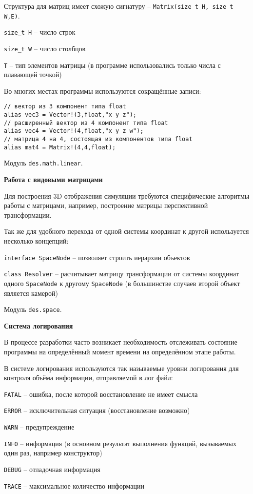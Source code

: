 Структура для матриц имеет схожую сигнатуру -- \verb|Matrix(size_t H, size_t W,E)|.

\begin{mintemize}
\item \verb|size_t H| -- число строк
\item \verb|size_t W| -- число столбцов
\item \verb|T| -- тип элементов матрицы (в программе использовались только числа с плавающей точкой)
\end{mintemize}

Во многих местах программы используются сокращённые записи:
\begin{verbatim}
// вектор из 3 компонент типа float
alias vec3 = Vector!(3,float,"x y z");
// расширенный вектор из 4 компонент типа float
alias vec4 = Vector!(4,float,"x y z w");
// матрица 4 на 4, состоящая из компонентов типа float
alias mat4 = Matrix!(4,4,float);
\end{verbatim}

Модуль \verb|des.math.linear|.

\textbf{Работа с видовыми матрицами}

Для построения 3D отображения симуляции требуются специфические алгоритмы работы
с матрицами, например, построение матрицы перспективной трансформации.

Так же для удобного перехода от одной системы координат к другой используется 
несколько концепций:

\begin{mintemize}
\item \verb|interface SpaceNode| -- позволяет строить иерархии объектов
\item \verb|class Resolver| -- расчитывает матрицу трансформации от системы координат
    одного \verb|SpaceNode| к другому \verb|SpaceNode| (в большинстве случаев второй объект
    является камерой)
\end{mintemize}

Модуль \verb|des.space|.

\textbf{Система логирования}

В процессе разработки часто возникает необходимость отслеживать состояние
программы на определённый момент времени на определённом этапе работы.

В системе логирования используются так называемые уровни логирования
для контроля объёма информации, отправляемой в лог файл:

\begin{mintemize}
\item \verb|FATAL| -- ошибка, после которой восстановление не имеет смысла
\item \verb|ERROR| -- исключительная ситуация (восстановление возможно)
\item \verb|WARN| -- предупреждение
\item \verb|INFO| -- информация (в основном результат выполнения функций, вызываемых один раз, например конструктор)
\item \verb|DEBUG| -- отладочная информация
\item \verb|TRACE| -- максимальное количество информации
\end{mintemize}

